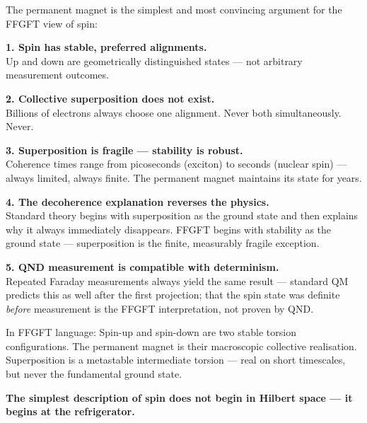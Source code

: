 \begin{conclusionBox}
The permanent magnet is the simplest and most convincing
argument for the FFGFT view of spin:

\textbf{1. Spin has stable, preferred alignments.}\\
Up and down are geometrically distinguished states ---
not arbitrary measurement outcomes.

\textbf{2. Collective superposition does not exist.}\\
Billions of electrons always choose one alignment.
Never both simultaneously. Never.

\textbf{3. Superposition is fragile --- stability is robust.}\\
Coherence times range from picoseconds (exciton) to
seconds (nuclear spin) --- always limited, always finite.
The permanent magnet maintains its state for years.

\textbf{4. The decoherence explanation reverses the physics.}\\
Standard theory begins with superposition as the ground state
and then explains why it always immediately disappears.
FFGFT begins with stability as the ground state ---
superposition is the finite, measurably fragile exception.

\textbf{5. QND measurement is compatible with determinism.}\\
Repeated Faraday measurements always yield the same result ---
standard QM predicts this as well after the first projection;
that the spin state was definite \emph{before} measurement is the
FFGFT interpretation, not proven by QND.

In FFGFT language:
Spin-up and spin-down are two stable torsion configurations.
The permanent magnet is their macroscopic collective realisation.
Superposition is a metastable intermediate torsion ---
real on short timescales, but never the fundamental ground state.

\textbf{The simplest description of spin does not begin in
Hilbert space --- it begins at the refrigerator.}
\end{conclusionBox}


